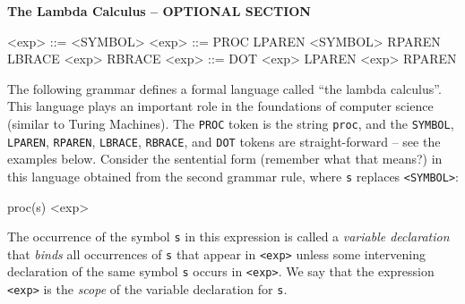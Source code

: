 \begin{minipage}[t]{\sw}
\slidenumber
\LARGE
{\bf The Lambda Calculus -- OPTIONAL SECTION}\exx
\begin{SaveVerbatim}{\MYlambda}
<exp> ::= <SYMBOL>
<exp> ::= PROC LPAREN <SYMBOL> RPAREN LBRACE <exp> RBRACE
<exp> ::= DOT <exp> LPAREN <exp> RPAREN
\end{SaveVerbatim}
The following grammar defines a formal language
called ``the lambda calculus''.
This language plays an important role
in the foundations of computer science
(similar to Turing Machines).
The \verb'PROC' token is the string \verb'proc',
and the \verb'SYMBOL', \verb'LPAREN', \verb'RPAREN',
\verb'LBRACE', \verb'RBRACE', and \verb'DOT'
tokens are straight-forward -- see the examples below.\exx
\emm{\Large\LightBox{\MYlambda}}\exx
Consider the sentential form (remember what that means?) in this language
obtained from the second grammar rule,
where \verb's' replaces \verb'<SYMBOL>':
\begin{qv}
proc(s) { <exp> }
\end{qv}
The occurrence of the symbol \verb's' in this expression
is called a {\em variable declaration}
that {\em binds} all occurrences
of \verb's' that appear in \verb'<exp>'
unless some intervening declaration of the same symbol \verb's'
occurs in \verb'<exp>'.
We say that the expression \verb'<exp>'
is the {\em scope} of the variable declaration for \verb's'.\exx
\end{minipage}
\clearpage
